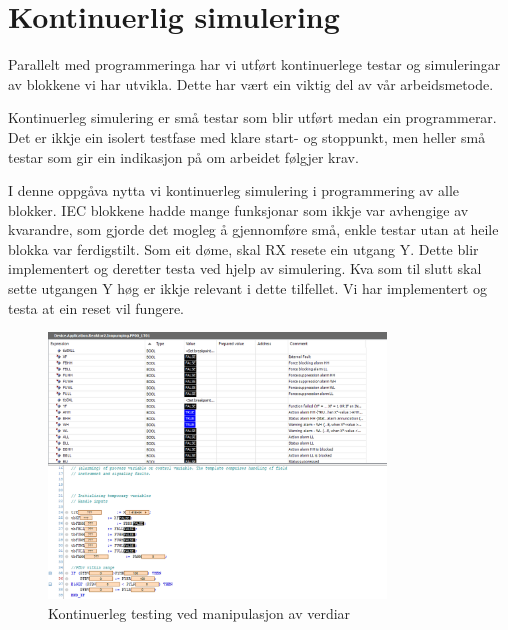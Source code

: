 \section{Kontinuerlig simulering}
\thispagestyle{fancy}

Parallelt med programmeringa har vi utført kontinuerlege testar og simuleringar av blokkene vi har utvikla. 
Dette har vært ein viktig del av vår arbeidsmetode. 

Kontinuerleg simulering er små testar som blir utført medan ein programmerar.
Det er ikkje ein isolert testfase med klare start- og stoppunkt, men heller små testar som gir ein indikasjon
på om arbeidet følgjer krav.

I denne oppgåva nytta vi kontinuerleg simulering i programmering av alle blokker.
\gls{IEC} blokkene hadde mange funksjonar som ikkje var avhengige av kvarandre,
som gjorde det mogleg å gjennomføre små, enkle testar utan at heile blokka var ferdigstilt.\newline
Som eit døme, skal RX resete ein utgang Y. Dette blir implementert og deretter testa ved hjelp av simulering.
Kva som til slutt skal sette utgangen Y høg er ikkje relevant i dette tilfellet. Vi har implementert 
og testa at ein reset vil fungere.


\begin{figure}[htbp]
    \centering
    \includegraphics[width=0.8\textwidth]{Bilder/kontinuerligSimulering.png}
    \caption{Kontinuerleg testing ved manipulasjon av verdiar}\label{fig:KontinuerlegSimulering}
\end{figure}


\newpage
